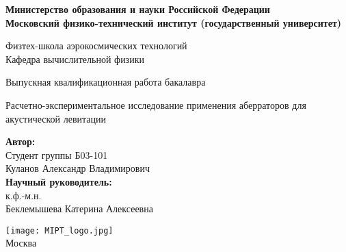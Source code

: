 \begin{center}
    \large\textbf{Министерство образования и науки Российской Федерации \\
    Московский физико-технический институт (государственный
    университет)} \\
    \vspace{1cm}

    Физтех-школа аэрокосмических технологий \\

    Кафедра вычислительной физики \\

    \vspace{3em}

    Выпускная квалификационная работа бакалавра
\end{center}

\begin{center}
    \vspace{\fill}
    \LARGE{Расчетно-экспериментальное исследование применения аберраторов для акустической левитации}

    \vspace{\fill}
\end{center}


\begin{flushright}
    \textbf{Автор:} \\
    Студент группы Б03-101\\
    Куланов Александр Владимирович \\
    \vspace{2em}
    \textbf{Научный руководитель:} \\
    к.ф.-м.н.\\
    Беклемышева Катерина Алексеевна \\
    \vspace{2em}
\end{flushright}

\vspace{\fill}

\begin{center}
    \texttt{[image: MIPT\_logo.jpg]}\\
    Москва \the\year{}
\end{center}

\thispagestyle{empty}

\newpage
\setcounter{page}{2}
\fancyfoot[c]{\thepage}
